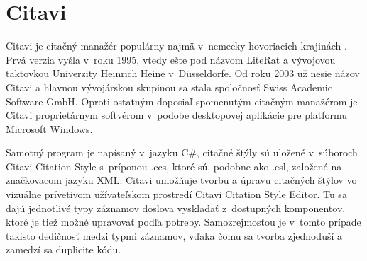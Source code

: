 \documentclass{fithesis3}
\begin{document}
	\section{Citavi}
	
	Citavi je citačný manažér populárny najmä v~nemecky hovoriacich krajinách \cite{Stohr2010}. Prvá verzia vyšla v~roku 1995, vtedy ešte pod názvom LiteRat a vývojovou taktovkou Univerzity Heinrich Heine v~Düsseldorfe. Od roku 2003 už nesie názov Citavi a hlavnou vývojárskou skupinou sa stala spoločnosť Swiss Academic Software GmbH. Oproti ostatným doposiaľ spomenutým citačným manažérom je Citavi proprietárnym softvérom v~podobe desktopovej aplikácie pre platformu Microsoft Windows.

	Samotný program je napísaný v~jazyku C\#, citačné štýly sú uložené v~súboroch Citavi Citation Style s~príponou .ccs, ktoré sú, podobne ako .csl, založené na značkovacom jazyku XML. Citavi umožňuje tvorbu a úpravu citačných štýlov vo vizuálne prívetivom užívateľskom prostredí Citavi Citation Style Editor. Tu sa dajú jednotlivé typy záznamov doslova vyskladať z~dostupných komponentov, ktoré je tiež možné upravovať podľa potreby. Samozrejmosťou je v~tomto prípade takisto dedičnosť medzi typmi záznamov, vďaka čomu sa tvorba zjednoduší a zamedzí sa duplicite kódu.
\end{document}

